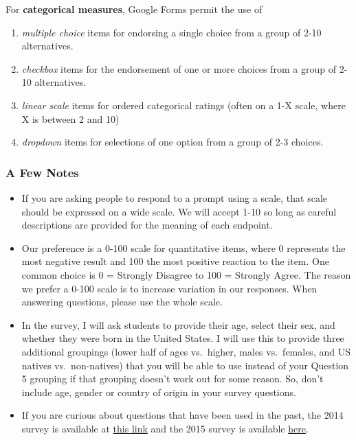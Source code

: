 \documentclass[]{book}
\providecommand{\tightlist}{%
  \setlength{\itemsep}{0pt}\setlength{\parskip}{0pt}}
\theoremstyle{definition}
\theoremstyle{definition}
\theoremstyle{definition}
\theoremstyle{remark}
\begin{document}
For \textbf{categorical measures}, Google Forms permit the use of

\begin{enumerate}
\def\labelenumi{\arabic{enumi}.}
\tightlist
\item
  \emph{multiple choice} items for endorsing a single choice from a
  group of 2-10 alternatives.
\item
  \emph{checkbox} items for the endorsement of one or more choices from
  a group of 2-10 alternatives.
\item
  \emph{linear scale} items for ordered categorical ratings (often on a
  1-X scale, where X is between 2 and 10)
\item
  \emph{dropdown} items for selections of one option from a group of 2-3
  choices.
\end{enumerate}

\hypertarget{a-few-notes}{%
\subsubsection{A Few Notes}\label{a-few-notes}}

\begin{itemize}
\tightlist
\item
  If you are asking people to respond to a prompt using a scale, that
  scale should be expressed on a wide scale. We will accept 1-10 so long
  as careful descriptions are provided for the meaning of each endpoint.
\item
  Our preference is a 0-100 scale for quantitative items, where 0
  represents the most negative result and 100 the most positive reaction
  to the item. One common choice is 0 = Strongly Disagree to 100 =
  Strongly Agree. The reason we prefer a 0-100 scale is to increase
  variation in our responses. When answering questions, please use the
  whole scale.
\item
  In the survey, I will ask students to provide their age, select their
  sex, and whether they were born in the United States. I will use this
  to provide three additional groupings (lower half of ages vs.~higher,
  males vs.~females, and US natives vs.~non-natives) that you will be
  able to use instead of your Question 5 grouping if that grouping
  doesn't work out for some reason. So, don't include age, gender or
  country of origin in your survey questions.
\item
  If you are curious about questions that have been used in the past,
  the 2014 survey is available at
  \href{https://docs.google.com/a/case.edu/forms/d/e/1FAIpQLScEgrawEzqKZNyYQZj3_AvqOzo8ay5NpqvEIg-Bwpcg2fqMKw/viewform?c=0\&w=1}{this
  link} and the 2015 survey is available
  \href{https://docs.google.com/a/case.edu/forms/d/e/1FAIpQLSduLMePv2ZGnjL8zM9a2p_H8JS1-ux0W1Xe3A6iDZW5MxJnMA/viewform}{here}.
\end{itemize}
\end{document}
